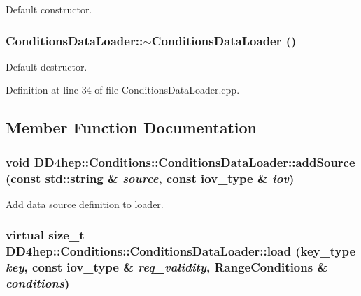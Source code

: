 Default constructor. \hypertarget{class_d_d4hep_1_1_conditions_1_1_conditions_data_loader_a5918a0778c3e0f0f80a441a5f3b88770}{
\subsubsection[{$\sim$ConditionsDataLoader}]{\setlength{\rightskip}{0pt plus 5cm}ConditionsDataLoader::$\sim$ConditionsDataLoader ()}}
\label{class_d_d4hep_1_1_conditions_1_1_conditions_data_loader_a5918a0778c3e0f0f80a441a5f3b88770}


Default destructor. 

Definition at line 34 of file ConditionsDataLoader.cpp.

\subsection{Member Function Documentation}
\hypertarget{class_d_d4hep_1_1_conditions_1_1_conditions_data_loader_a13d300e82815a80b4c1601c95fff20cc}{
\subsubsection[{addSource}]{\setlength{\rightskip}{0pt plus 5cm}void DD4hep::Conditions::ConditionsDataLoader::addSource (const std::string \& {\em source}, \/  const {\bf iov\_\-type} \& {\em iov})}}
\label{class_d_d4hep_1_1_conditions_1_1_conditions_data_loader_a13d300e82815a80b4c1601c95fff20cc}


Add data source definition to loader. \hypertarget{class_d_d4hep_1_1_conditions_1_1_conditions_data_loader_a5ae9c04eb1198bf3ca9bc6d54e6bfd8c}{
\subsubsection[{load}]{\setlength{\rightskip}{0pt plus 5cm}virtual size\_\-t DD4hep::Conditions::ConditionsDataLoader::load ({\bf key\_\-type} {\em key}, \/  const {\bf iov\_\-type} \& {\em req\_\-validity}, \/  {\bf RangeConditions} \& {\em conditions})}}
\label{class_d_d4hep_1_1_conditions_1_1_conditions_data_loader_a5ae9c04eb1198bf3ca9bc6d54e6bfd8c}


